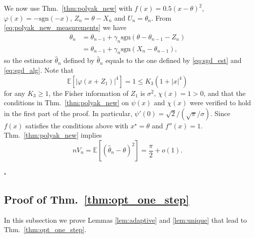 \documentclass[letterpaper, conference]{IEEEtran}      %
\newcommand{\sgn}{\mathrm{sgn} }
\newcommand*{\QEDA}{\hfill\ensuremath{\square}}
\begin{document}
We now use Thm.~\ref{thm:polyak_new} with $f(x) = 0.5(x-\theta)^2$, $\varphi(x) = -\sgn(-x)$, $Z_n = \theta-X_n$ and $U_n = \theta_n$. From \eqref{eq:polyak_new_measurements} we have
\begin{align*} 
\theta_n & = \theta_{n-1} + \gamma_n \sgn(\theta-\theta_{n-1} - Z_n )  \\
& = \theta_{n-1} + \gamma_n \sgn(X_n-\theta_{n-1} ),
\end{align*}
so the estimator $\widehat{\theta}_n$ defined by $\widehat{\theta}_n$ equals to the one defined by \eqref{eq:sgd_est} and \eqref{eq:sgd_alg}. Note that
\[
\mathbb E \left[ | \varphi(x+Z_1) |^4 \right] = 1 \leq K_3(1+|x|^4)
\]
for any $K_3\geq 1$, the Fisher information of $Z_1$ is $\sigma^2$, $\chi(x) = 1 > 0$, and that 
the conditions in Thm.~\ref{thm:polyak_new} on $\psi(x)$ and $\chi(x)$ were verified to hold in the first part of the proof. In particular, $\psi'(0) = \sqrt{2}/ (\sqrt{\pi}/\sigma)$. Since $f(x)$ satisfies the conditions above with $x^\star = \theta$ and $f''(x) = 1$. Thm.~\ref{thm:polyak_new} implies 
\[
n V_n = \mathbb E \left[ \left(\widehat{\theta}_n-\theta \right)^2 \right]  = \frac{\pi}{2}  + o(1).
\]

 \QEDA


\subsection*{Proof of Thm.~\ref{thm:opt_one_step}}
In this subsection we prove Lemmas \ref{lem:adaptive} and \ref{lem:unique} that lead to Thm.~\ref{thm:opt_one_step}. 
\end{document}
